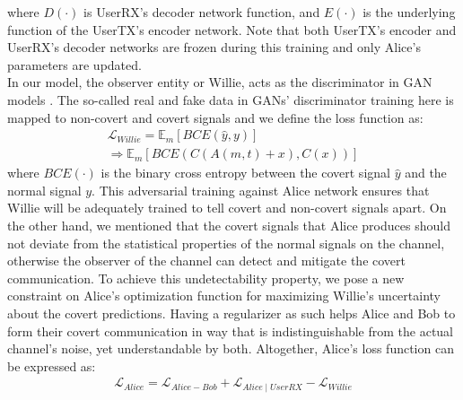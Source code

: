 where \(D(\cdot)\) is UserRX's decoder network function, and \(E(\cdot)\) is the underlying function of the UserTX's encoder network. Note that both UserTX's encoder and UserRX's decoder networks are frozen during this training and only Alice's parameters are updated.\\
In our model, the observer entity or Willie, acts as the discriminator in GAN models \cite{goodfellow2014generative}. The so-called real and fake data in GANs' discriminator training here is mapped to non-covert and covert signals and we define the loss function as:
\begin{equation}
		\begin{array}{l}
	\mathcal{L}_{Willie} = \mathbb{E}_{m}[BCE(\hat{y}, y)] \\ \Rightarrow \mathbb{E}_{m}[BCE(C(A(m,t) + x), C(x))]
	\end{array}
\end{equation}
where \(BCE(\cdot)\) is the binary cross entropy between the covert signal \(\hat{y}\) and the normal signal \(y\). This adversarial training against Alice network ensures that Willie will be adequately trained to tell covert and non-covert signals apart. On the other hand, we mentioned that the covert signals that Alice produces should not deviate from the statistical properties of the normal signals on the channel, otherwise the observer of the channel can detect and mitigate the covert communication. To achieve this undetectability property, we pose a new constraint on Alice's optimization function for maximizing Willie's uncertainty about the covert predictions. Having a regularizer as such helps Alice and Bob to form their covert communication in way that is indistinguishable from the actual channel's noise, yet understandable by both. Altogether, Alice's loss function can be expressed as:
\begin{equation}
	\begin{array}{l} \label{alice_bob_loss}
	\mathcal{L}_{Alice} = \mathcal{L}_{Alice-Bob} + \mathcal{L}_{Alice \mid UserRX} - \mathcal{L}_{Willie}
\end{array}
\end{equation}
\iffalse Algorithm (?) summarizes our approach for optimizing the whole system. \fi
